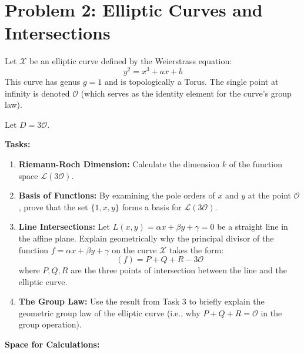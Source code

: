\documentclass[11pt, a4paper, twoside]{article}
\newcommand{\X}{\mathcal{X}}
\newcommand{\cO}{\mathcal{O}}
\begin{document}
	\newpage
	
	\section*{Problem 2: Elliptic Curves and Intersections}
	
		Let $\X$ be an elliptic curve defined by the Weierstrass equation:
		$$ y^2 = x^3 + ax + b $$
		This curve has genus $g=1$ and is topologically a Torus. The single point at infinity is denoted $\cO$ (which serves as the identity element for the curve's group law). 
		
		Let $D = 3\cO$.
		
		\vspace{0.5em}
		\textbf{Tasks:}
		\begin{enumerate}
			\item \textbf{Riemann-Roch Dimension:} Calculate the dimension $k$ of the function space $\mathcal{L}(3\cO)$.
			\item \textbf{Basis of Functions:} By examining the pole orders of $x$ and $y$ at the point $\cO$, prove that the set $\{1, x, y\}$ forms a basis for $\mathcal{L}(3\cO)$.
			\item \textbf{Line Intersections:} Let $L(x,y) = \alpha x + \beta y + \gamma = 0$ be a straight line in the affine plane. Explain geometrically why the principal divisor of the function $f = \alpha x + \beta y + \gamma$ on the curve $\X$ takes the form:
			$$ (f) = P + Q + R - 3\cO $$
			where $P, Q, R$ are the three points of intersection between the line and the elliptic curve.
			\item \textbf{The Group Law:} Use the result from Task 3 to briefly explain the geometric group law of the elliptic curve (i.e., why $P + Q + R = \cO$ in the group operation).
		\end{enumerate}
	
	\vspace{1.5em}
	\noindent\textbf{Space for Calculations:}
	
\end{document}
